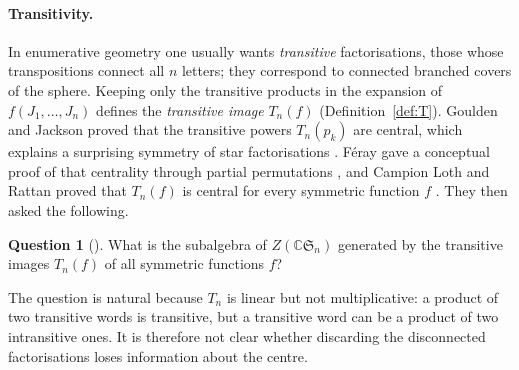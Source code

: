 \documentclass[11pt,a4paper]{article}
\theoremstyle{definition}
\newtheorem{question}[theorem]{Question}
\newcommand{\Sn}{\mathfrak S}
\newcommand{\C}{\mathbb C}
\begin{document}
\paragraph{Transitivity.} In enumerative geometry one usually wants \emph{transitive} factorisations, those whose transpositions connect all $n$ letters; they correspond to connected branched covers of the sphere. Keeping only the transitive products in the expansion of $f(J_1,\ldots,J_n)$ defines the \emph{transitive image} $T_n(f)$ (Definition~\ref{def:T}). Goulden and Jackson proved that the transitive powers $T_n(p_k)$ are central, which explains a surprising symmetry of star factorisations \cite{gj}. F\'eray gave a conceptual proof of that centrality through partial permutations \cite{feray}, and Campion Loth and Rattan proved that $T_n(f)$ is central for every symmetric function $f$ \cite[Theorem~6]{clr}. They then asked the following.

\begin{question}[{\cite[Question~12]{clr}}]
What is the subalgebra of $Z(\C\Sn_n)$ generated by the transitive images $T_n(f)$ of all symmetric functions $f$?
\end{question}

The question is natural because $T_n$ is linear but not multiplicative: a product of two transitive words is transitive, but a transitive word can be a product of two intransitive ones. It is therefore not clear whether discarding the disconnected factorisations loses information about the centre.
\end{document}
